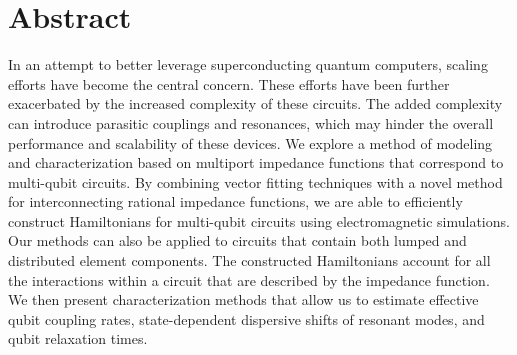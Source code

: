 \section*{Abstract}
\thispagestyle{empty}

In an attempt to better leverage superconducting quantum computers, scaling efforts have become the central concern. These efforts have been further exacerbated by the increased complexity of these circuits. The added complexity can introduce parasitic couplings and resonances, which may hinder the overall performance and scalability of these devices. We explore a method of modeling and characterization based on multiport impedance functions that correspond to multi-qubit circuits. By combining vector fitting techniques with a novel method for interconnecting rational impedance functions, we are able to efficiently construct Hamiltonians for multi-qubit circuits using electromagnetic simulations. Our methods can also be applied to circuits that contain both lumped and distributed element components. The constructed Hamiltonians account for all the interactions within a circuit that are described by the impedance function. We then present characterization methods that allow us to estimate effective qubit coupling rates, state-dependent dispersive shifts of resonant modes, and qubit relaxation times. 

\newpage
\thispagestyle{empty}
\mbox{}
\newpage